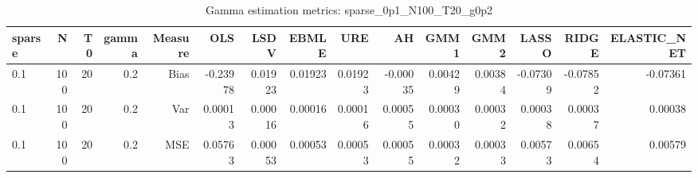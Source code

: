 \begin{table}[!htbp]\centering
\caption{Gamma estimation metrics: sparse_0p1_N100_T20_g0p2}
\label{tab:table1_sparse_0p1_N100_T20_g0p2}
\begin{tabular}{lrrrrrrrrrrrrrr}
\hline
sparse & N & T0 & gamma & Measure & OLS & LSDV & EBMLE & URE & AH & GMM1 & GMM2 & LASSO & RIDGE & ELASTIC_NET \\
\hline
0.1 & 100 & 20 & 0.2 & Bias & -0.23978 & 0.01923 & 0.01923 & 0.01923 & -0.00035 & 0.00429 & 0.00384 & -0.07309 & -0.07852 & -0.07361 \\
0.1 & 100 & 20 & 0.2 & Var & 0.00013 & 0.00016 & 0.00016 & 0.00016 & 0.00055 & 0.00030 & 0.00032 & 0.00038 & 0.00037 & 0.00038 \\
0.1 & 100 & 20 & 0.2 & MSE & 0.05763 & 0.00053 & 0.00053 & 0.00053 & 0.00055 & 0.00032 & 0.00033 & 0.00573 & 0.00654 & 0.00579 \\
\hline
\end{tabular}
\end{table}

